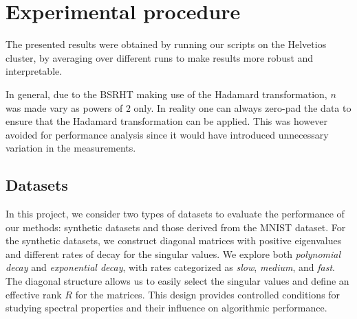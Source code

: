 \documentclass[a4paper, 12pt,oneside]{article}
\begin{document}
	\section{Experimental procedure}
		The presented results were obtained by running our scripts on the Helvetios cluster, by averaging over different runs to make results more robust and interpretable.
		
		In general, due to the BSRHT making use of the Hadamard transformation, $n$ was made vary as powers of $2$ only. In reality one can always zero-pad the data to ensure that the Hadamard transformation can be applied. This was however avoided for performance analysis since it would have introduced unnecessary variation in the measurements.  
		\subsection{Datasets}
		In this project, we consider two types of datasets to evaluate the performance of our methods: synthetic datasets and those derived from the MNIST dataset. For the synthetic datasets, we construct diagonal matrices with positive eigenvalues and different rates of decay for the singular values. We explore both \textit{polynomial decay} and \textit{exponential decay}, with rates categorized as \textit{slow}, \textit{medium}, and \textit{fast}. The diagonal structure allows us to easily select the singular values and define an effective rank \( R \) for the matrices. This design provides controlled conditions for studying spectral properties and their influence on algorithmic performance.
\end{document}
